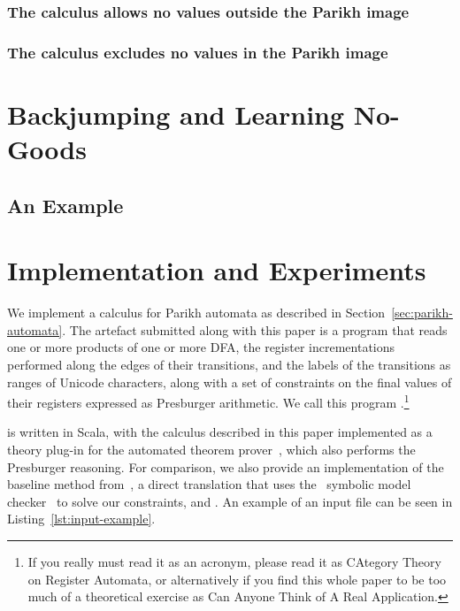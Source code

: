 \documentclass[acmsmall,review,anonymous]{acmart}\settopmatter{printfolios=true,printccs=false,printacmref=true}
\theoremstyle{definition}
\begin{document}
\subsubsection{The calculus allows no values outside the Parikh image}
\subsubsection{The calculus excludes no values in the Parikh image}


\section{Backjumping and Learning No-Goods}

\subsection{An Example}

\section{Implementation and Experiments}\label{sec:implementation}

We implement a calculus for Parikh automata as described in
Section~\ref{sec:parikh-automata}. The artefact submitted along with this paper
is a program that reads one or more products of one or more DFA, the
register incrementations performed along the edges of their transitions, and the
labels of the transitions as ranges of Unicode characters, along with a set of
constraints on the final values of their registers expressed as Presburger
arithmetic. We call this program \Catra{}.\footnote{If you really must read it
as an acronym, please read it as CAtegory Theory on Register Automata, or
alternatively if you find this whole paper to be too much of a theoretical
exercise as Can Anyone Think of A Real Application.}

\Catra{} is written in Scala, with the calculus described in this paper
implemented as a theory plug-in for the \Princess{} automated theorem
prover~\cite{princess}, which also performs the Presburger reasoning. For
comparison, we also provide an implementation of the baseline method
from~\cite{generate-parikh-image}, a direct translation that uses the~\Nuxmv{}
symbolic model checker~\cite{nuxmv} to solve our constraints, and . An example of an input file  can be seen in Listing~\ref{lst:input-example}.
\end{document}
